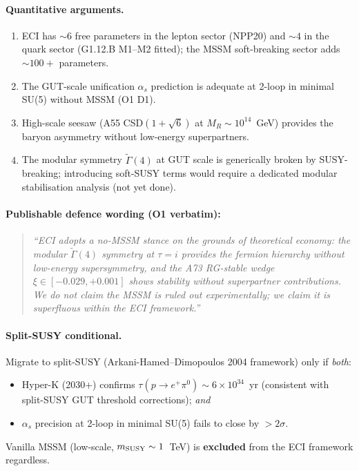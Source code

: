 \documentclass[a4paper,11pt]{article}
\theoremstyle{definition}
\theoremstyle{remark}
\begin{document}
\paragraph{Quantitative arguments.}
\begin{enumerate}
  \item ECI has $\sim 6$ free parameters in the lepton sector
    (NPP20) and $\sim 4$ in the quark sector (G1.12.B M1--M2
    fitted); the MSSM soft-breaking sector adds $\sim 100+$
    parameters.
  \item The GUT-scale unification $\alpha_s$ prediction is
    adequate at 2-loop in minimal SU(5) without MSSM (O1 D1).
  \item High-scale seesaw (A55 CSD$(1+\sqrt 6)$ at $M_R\sim
    10^{14}$~GeV) provides the baryon asymmetry without
    low-energy superpartners.
  \item The modular symmetry $\widetilde{\Gamma}(4)$ at GUT
    scale is generically broken by SUSY-breaking; introducing
    soft-SUSY terms would require a dedicated modular stabilisation
    analysis (not yet done).
\end{enumerate}

\paragraph{Publishable defence wording (O1 verbatim):}
\begin{quote}\itshape
``ECI adopts a no-MSSM stance on the grounds of theoretical
economy: the modular $\widetilde{\Gamma}(4)$ symmetry at $\tau=i$
provides the fermion hierarchy without low-energy supersymmetry,
and the A73 RG-stable wedge $\xi\in[-0.029,+0.001]$ shows
stability without superpartner contributions.  We do not claim
the MSSM is ruled out experimentally; we claim it is superfluous
within the ECI framework.''
\end{quote}

\paragraph{Split-SUSY conditional.}
Migrate to split-SUSY (Arkani-Hamed--Dimopoulos 2004 framework)
only if \emph{both}:
\begin{itemize}
  \item Hyper-K (2030+) confirms
    $\tau(p\to e^+\pi^0)\sim 6\times10^{34}$~yr (consistent with
    split-SUSY GUT threshold corrections); \emph{and}
  \item $\alpha_s$ precision at 2-loop in minimal SU(5) fails to
    close by $>2\sigma$.
\end{itemize}
Vanilla MSSM (low-scale, $m_{\rm SUSY}\sim1$~TeV) is \textbf{excluded}
from the ECI framework regardless.
\end{document}
